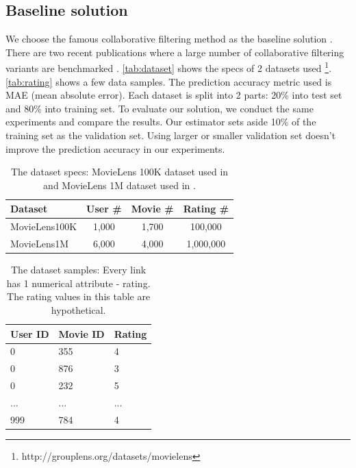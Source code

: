 \documentclass[twocolumn]{article}
\begin{document}
\subsection{Baseline solution}
We choose the famous collaborative filtering method as the baseline solution 
\cite{polatidis2016multi}.
There are two recent publications where a large number of collaborative 
filtering variants are benchmarked \cite{hwang2016efficient} 
\cite{polatidis2016multi}. 
\autoref{tab:dataset} shows the specs of 2 datasets used
\cite{harper2015movielens} \footnote{http://grouplens.org/datasets/movielens}.
\autoref{tab:rating} shows a few data samples.
The prediction accuracy metric used is MAE (mean absolute error).
Each dataset is split into 2 parts: 20\% into test set and 80\% 
into training set.
To evaluate our solution, we conduct the same experiments and compare the 
results.
Our estimator sets aside 10\% of the training set as the validation set.
Using larger or smaller validation set doesn't improve the prediction accuracy 
in our experiments.
\begin{table}[h]
	\centering
	\caption{The dataset specs: MovieLens 100K dataset used in 
	\cite{hwang2016efficient} and 
	MovieLens 1M dataset used in \cite{polatidis2016multi}.}
	\begin{tabularx}{0.5\textwidth}{ |X|c|c|c|}  \hline
		\textbf{Dataset} & \textbf{User \#} & \textbf{Movie \#} & 		
		\textbf{Rating \#} 
		\\ \hline
		MovieLens100K & 1,000 & 1,700 & 100,000 \\ \hline
		MovieLens1M & 6,000 & 4,000 & 1,000,000 \\ \hline
	\end{tabularx}
	\label{tab:dataset}
\end{table}
\begin{table}[h]
	\centering
	\caption{The dataset samples: Every link has 1 numerical attribute - 
		rating. The rating values in this table are hypothetical.}
	\begin{tabularx}{0.5\textwidth}{ |X|X|X| }  \hline
		\textbf{User ID} & \textbf{Movie ID} & \textbf{Rating} \\ \hline
		0 & 355 & 4 \\ \hline
		0 & 876 & 3 \\ \hline
		0 & 232 & 5 \\ \hline
		... & ... & ... \\ \hline
		999 & 784 & 4 \\ \hline
	\end{tabularx}
	\label{tab:rating}
\end{table}
\end{document}
